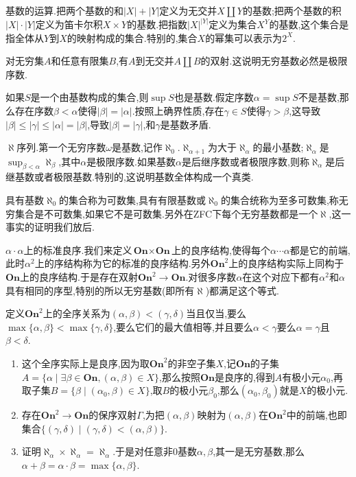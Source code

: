 基数的运算.把两个基数的和$|X|+|Y|$定义为无交并$X\coprod Y$的基数;把两个基数的积$|X|\cdot|Y|$定义为笛卡尔积$X\times Y$的基数.把指数$|X|^{|Y|}$定义为集合$X^{Y}$的基数,这个集合是指全体从$Y$到$X$的映射构成的集合.特别的,集合$X$的幂集可以表示为$2^X$.

对无穷集$A$和任意有限集$B$,有$A$到无交并$A\coprod B$的双射.这说明无穷基数必然是极限序数.

如果$S$是一个由基数构成的集合,则$\sup S$也是基数.假定序数$\alpha=\sup S$不是基数,那么存在序数$\beta<\alpha$使得$|\beta|=|\alpha|$.按照上确界性质,存在$\gamma\in S$使得$\gamma>\beta$,这导致$|\beta|\le|\gamma|\le|\alpha|=|\beta|$,导致$|\beta|=|\gamma|$,和$\gamma$是基数矛盾.

$\aleph$序列.第一个无穷序数$\omega$是基数,记作$\aleph_0$.$\aleph_{\alpha+1}$为大于$\aleph_{\alpha}$的最小基数;$\aleph_{\alpha}$是$\sup_{\beta<\alpha}\aleph_{\beta}$,其中$\alpha$是极限序数.如果基数$\alpha$是后继序数或者极限序数,则称$\aleph_{\alpha}$是后继基数或者极限基数.特别的,这说明基数全体构成一个真类.

具有基数$\aleph_0$的集合称为可数集,具有有限基数或$\aleph_0$的集合统称为至多可数集,称无穷集合是不可数集,如果它不是可数集.另外在ZFC下每个无穷基数都是一个$\aleph$,这一事实的证明我们放后.

$\alpha\cdot\alpha$上的标准良序.我们来定义$\textbf{On}\times\textbf{On}$上的良序结构,使得每个$\alpha\cdots\alpha$都是它的前端,此时$\alpha^2$上的序结构称为它的标准的良序结构.另外$\textbf{On}^2$上的良序结构实际上同构于$\textbf{On}$上的良序结构.于是存在双射$\textbf{On}^2\to\textbf{On}$.对很多序数$\alpha$在这个对应下都有$\alpha^2$和$\alpha$具有相同的序型,特别的所以无穷基数(即所有$\aleph$)都满足这个等式.

定义$\textbf{On}^2$上的全序关系为$(\alpha,\beta)<(\gamma,\delta)$当且仅当,要么$\max\{\alpha,\beta\}<\max\{\gamma,\delta\}$,要么它们的最大值相等,并且要么$\alpha<\gamma$要么$\alpha=\gamma$且$\beta<\delta$.
\begin{enumerate}
	\item 这个全序实际上是良序,因为取$\textbf{On}^2$的非空子集$X$,记$\textbf{On}$的子集$A=\{\alpha\mid\exists\beta\in\textbf{On},(\alpha,\beta)\in X\}$,那么按照$\textbf{On}$是良序的,得到$A$有极小元$\alpha_0$,再取子集$B=\{\beta\mid(\alpha_0,\beta)\in X\}$,取$B$的极小元$\beta_0$,那么$(\alpha_0,\beta_0)$就是$X$的极小元.
	\item 存在$\textbf{On}^2\to\textbf{On}$的保序双射$\Gamma$,为把$(\alpha,\beta)$映射为$(\alpha,\beta)$在$\textbf{On}^2$中的前端,也即集合$\{(\gamma,\delta)\mid(\gamma,\delta)<(\alpha,\beta)\}$.
	\item 证明$\aleph_{\alpha}\times\aleph_{\alpha}=\aleph_{\alpha}$.于是对任意非0基数$\alpha,\beta$,其一是无穷基数,那么$\alpha+\beta=\alpha\cdot\beta=\max\{\alpha,\beta\}$.
\end{enumerate}

